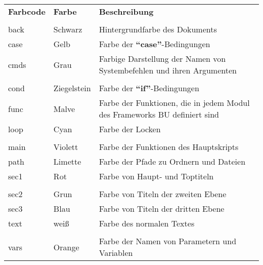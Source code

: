 \documentclass[a4paper,10pt]{article}
\begin{document}
    \begin{justify}
        \begin{tabular}{lll}
            \textbf{Farbcode} & \textbf{Farbe}          & \textbf{Beschreibung}\\\\

            \color{text}back  & \color{text}Schwarz     & \color{text}Hintergrundfarbe des Dokuments\\
            \color{case}case  & \color{case}Gelb        & \color{case}Farbe der \textbf{``case''}-Bedingungen\\
            \color{cmds}cmds  & \color{cmds}Grau        & \color{cmds}Farbige Darstellung der Namen von Systembefehlen und ihren Argumenten\\\\

            \color{cond}cond  & \color{cond}Ziegelstein & \color{cond}Farbe der \textbf{``if''}-Bedingungen\\
            \color{func}func  & \color{func}Malve       & \color{func}Farbe der Funktionen, die in jedem Modul des Frameworks BU definiert sind\\
            \color{loop}loop  & \color{loop}Cyan        & \color{loop}Farbe der Locken\\\\

            \color{main}main  & \color{main}Violett     & \color{main}Farbe der Funktionen des Hauptskripts\\
            \color{path}path  & \color{path}Limette     & \color{path}Farbe der Pfade zu Ordnern und Dateien\\
            \color{sec1}sec1  & \color{sec1}Rot         & \color{sec1}Farbe von Haupt- und Toptiteln\\\\

            \color{sec2}sec2  & \color{sec2}Grun        & \color{sec2}Farbe von Titeln der zweiten Ebene\\
            \color{sec3}sec3  & \color{sec3}Blau        & \color{sec3}Farbe von Titeln der dritten Ebene\\
            \color{text}text  & \color{text}weiß        & \color{text}Farbe des normalen Textes\\\\

            \color{vars}vars  & \color{vars}Orange      & \color{vars}Farbe der Namen von Parametern und Variablen\\
        \end{tabular}
    \end{justify}
\end{document}

